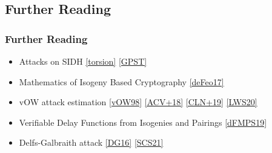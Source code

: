 \documentclass{beamer}
\begin{document}
\subsection{Further Reading}
\begin{frame}[noframenumbering]
    \frametitle{Further Reading}
    \begin{itemize}
        \item Attacks on SIDH \href{https://eprint.iacr.org/2020/633.pdf}{[torsion]} \href{https://eprint.iacr.org/2016/859.pdf}{[GPST]}
        \item Mathematics of Isogeny Based Cryptography \href{https://arxiv.org/pdf/1711.04062.pdf}{[deFeo17]}
        \item vOW attack estimation \href{https://link.springer.com/content/pdf/10.1007/PL00003816.pdf}{[vOW98]} \href{https://eprint.iacr.org/2018/313.pdf}{[ACV+18]} \href{https://eprint.iacr.org/2019/298.pdf}{[CLN+19]} \href{https://eprint.iacr.org/2020/1457.pdf}{[LWS20]}
        \item Verifiable Delay Functions from Isogenies and Pairings \href{https://eprint.iacr.org/2019/166.pdf}{[dFMPS19]}
        \item Delfs-Galbraith attack \href{https://link.springer.com/article/10.1007/s10623-014-0010-1}{[DG16]} \href{https://eprint.iacr.org/2021/1488.pdf}{[SCS21]}
        
      \end{itemize}
\end{frame}
\end{document}

